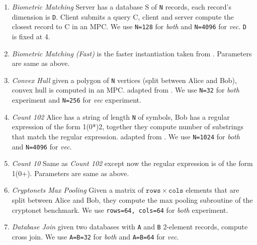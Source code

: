 


\begin{enumerate}
    \item {\em Biometric Matching} Server has a database S of {\tt N} records, each record's dimension is {\tt D}. Client submits a query C, client and server compute the closest record to C in an MPC. We use {\tt N=128} for {\em both} and {\tt N=4096} for {\em vec}. {\tt D} is fixed at 4.
    
    \item {\em Biometric Matching (Fast)} is the faster instantiation taken from \cite{Demmler:2015}. Parameters are same as above.
    
    \item {\em Convex Hull} given a polygon of {\tt N} vertices (split between Alice and Bob), convex hull is computed in an MPC. adapted from \cite{Farzan:2021}. We use {\tt N=32} for {\em both} experiment and {\tt N=256} for {\em vec} experiment.
    
    \item {\em Count 102} Alice has a string of length {\tt N} of symbols, Bob has a regular expression of the form 1(0*)2, together they compute number of substrings that match the regular expression. adapted from \cite{Farzan:2021}. We use {\tt N=1024} for {\em both} and {\tt N=4096} for {\em vec}.
    
    \item {\em Count 10} Same as {\em Count 102} except now the regular expression is of the form 1(0+). Parameters are same as above.
    
    \item {\em Cryptonets Max Pooling} Given a matrix of $\mathtt{rows}\times\mathtt{cols}$ elements that are split between Alice and Bob, they compute the max pooling subroutine of the cryptonet benchmark\cite{Dowlin:2016}. We use {\tt rows=64, cols=64} for {\em both} experiment.

    \item {\em Database Join} given two databases with {\tt A} and {\tt B} 2-element records, compute cross join. We use {\tt A=B=32} for {\em both} and {\tt A=B=64} for {\em vec}.
    

\end{enumerate}
